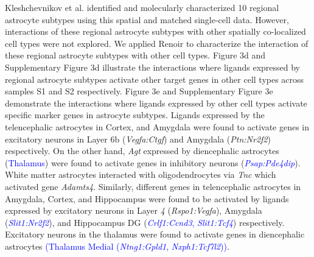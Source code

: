 



Kleshchevnikov et al. \citep{Kleshchevnikov2022} identified and molecularly characterized 10 regional astrocyte subtypes using this spatial and matched single-cell data. However, interactions of these regional astrocyte subtypes with other spatially co-localized cell types were not explored. We applied Renoir to characterize the interaction of these regional astrocyte subtypes with other cell types. Figure 3d and Supplementary Figure 3d illustrate the interactions where ligands expressed by regional astrocyte subtypes activate other target genes in other cell types across samples S1 and S2 respectively. Figure 3e and Supplementary Figure 3e demonstrate the interactions where ligands expressed by other cell types activate specific marker genes in astrocyte subtypes. Ligands expressed by the telencephalic astrocytes in Cortex, and Amygdala were found to activate genes in excitatory neurons in Layer 6b (\textit{Vegfa:Ctgf}) and Amygdala (\textit{Ptn:Nr2f2}) respectively. On the other hand, \textit{Agt} expressed by diencephalic astrocytes (\textcolor{blue}{Thalamus}) were found to activate genes in inhibitory neurons (\textcolor{blue}{\textit{Psap:Pde4dip}}). White matter astrocytes interacted with oligodendrocytes via \textit{Tnc} which activated gene \textit{Adamts4}. Similarly, different genes in telencephalic astrocytes in Amygdala, Cortex, and Hippocampus were found to be activated by ligands expressed by excitatory neurons in Layer \textit{4} (\textit{Rspo1:Vegfa}), Amygdala (\textcolor{blue}{\textit{Slit1:Nr2f2}}), and Hippocampus DG (\textcolor{blue}{\textit{Crlf1:Ccnd3}, \textit{Slit1:Tcf4}}) respectively. Excitatory neurons in the thalamus were found to activate genes in diencephalic astrocytes \textcolor{blue}{(Thalamus Medial (\textit{Ntng1:Gpld1}, \textit{Nxph1:Tcf7l2}))}.

